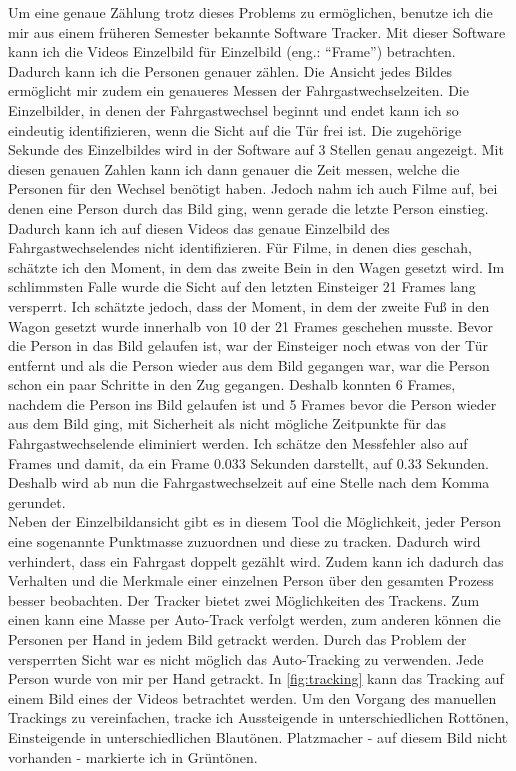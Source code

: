 Um eine genaue Zählung trotz dieses Problems zu ermöglichen, benutze ich die mir aus einem früheren Semester bekannte Software \textsf{Tracker}. Mit dieser Software kann ich die Videos Einzelbild für Einzelbild (eng.: "`Frame"') betrachten. Dadurch kann ich die Personen genauer zählen. Die Ansicht jedes Bildes ermöglicht mir zudem ein genaueres Messen der Fahrgastwechselzeiten. Die Einzelbilder, in denen der Fahrgastwechsel beginnt und endet kann ich so eindeutig identifizieren, wenn die Sicht auf die Tür frei ist. Die zugehörige Sekunde des Einzelbildes wird in der Software auf 3 Stellen genau angezeigt. Mit diesen genauen Zahlen kann ich dann genauer die Zeit messen, welche die Personen für den Wechsel benötigt haben. Jedoch nahm ich auch Filme auf, bei denen eine Person durch das Bild ging, wenn gerade die letzte Person einstieg. Dadurch kann ich auf diesen Videos das genaue Einzelbild des Fahrgastwechselendes nicht identifizieren. Für Filme, in denen dies geschah, schätzte ich den Moment, in dem das zweite Bein in den Wagen gesetzt wird. Im schlimmsten Falle wurde die Sicht auf den letzten Einsteiger 21 Frames lang versperrt. Ich schätzte jedoch, dass der Moment, in dem der zweite Fuß in den Wagon gesetzt wurde innerhalb von 10 der 21 Frames geschehen musste. Bevor die Person in das Bild gelaufen ist, war der Einsteiger noch etwas von der Tür entfernt und als die Person wieder aus dem Bild gegangen war, war die Person schon ein paar Schritte in den Zug gegangen. Deshalb konnten 6 Frames, nachdem die Person ins Bild gelaufen ist und 5 Frames bevor die Person wieder aus dem Bild ging, mit Sicherheit als nicht mögliche Zeitpunkte für das Fahrgastwechselende eliminiert werden. Ich schätze den Messfehler also auf  Frames und damit, da ein Frame 0.033 Sekunden darstellt, auf 0.33 Sekunden. Deshalb wird ab nun die Fahrgastwechselzeit auf eine Stelle nach dem Komma gerundet.\\
Neben der Einzelbildansicht gibt es in diesem Tool die Möglichkeit, jeder Person eine sogenannte Punktmasse zuzuordnen und diese zu tracken. Dadurch wird verhindert, dass ein Fahrgast doppelt gezählt wird. Zudem kann ich dadurch das Verhalten und die Merkmale einer einzelnen Person über den gesamten Prozess besser beobachten. Der \textsf{Tracker} bietet zwei Möglichkeiten des Trackens. Zum einen kann eine Masse per Auto-Track verfolgt werden, zum anderen können die Personen per Hand in jedem Bild getrackt werden. Durch das Problem der versperrten Sicht war es nicht möglich das Auto-Tracking zu verwenden. Jede Person wurde von mir per Hand getrackt. In \figurename \ref{fig:tracking} kann das Tracking auf einem Bild eines der Videos betrachtet werden. Um den Vorgang des manuellen Trackings zu vereinfachen, tracke ich Aussteigende in unterschiedlichen Rottönen, Einsteigende in unterschiedlichen Blautönen. Platzmacher - auf diesem Bild nicht vorhanden - markierte ich in Grüntönen. \\
